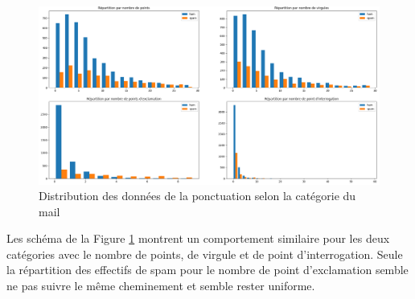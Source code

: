 \documentclass[a4paper,12pt]{article}
\begin{document}
			\begin{figure}[H]
				\includegraphics[width=\linewidth]{img/p2ponct.png}
				\caption{Distribution des données de la ponctuation selon la catégorie du mail}
				\label{fig:p2ponct}
			\end{figure}	
			Les schéma de la Figure \ref{fig:p2ponct} montrent un comportement similaire pour les deux catégories avec le nombre de points, de virgule et de point d'interrogation. 
			Seule la répartition des effectifs de spam pour le nombre de point d'exclamation semble ne pas suivre le même cheminement et semble rester uniforme. 
			
			
			
\end{document}
